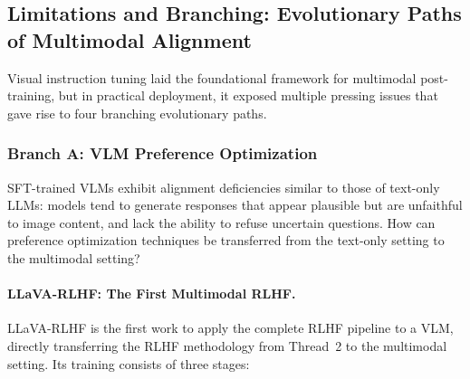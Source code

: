 \subsection{Limitations and Branching: Evolutionary Paths of Multimodal Alignment}
\label{sec:t5-branches}

Visual instruction tuning laid the foundational framework for multimodal post-training,
but in practical deployment, it exposed multiple pressing issues that gave rise to four branching evolutionary paths.

\subsubsection{Branch A: VLM Preference Optimization}
\label{sec:t5-branch-a}

\begin{problembox}
SFT-trained VLMs exhibit alignment deficiencies similar to those of text-only LLMs:
models tend to generate responses that appear plausible but are unfaithful to image content,
and lack the ability to refuse uncertain questions.
How can preference optimization techniques be transferred from the text-only setting to the multimodal setting?
\end{problembox}

\paragraph{LLaVA-RLHF: The First Multimodal RLHF.}
LLaVA-RLHF \cite{sun2023llava-rlhf} is the first work to apply the complete RLHF pipeline to a VLM,
directly transferring the RLHF methodology from Thread~2
to the multimodal setting.
Its training consists of three stages:

